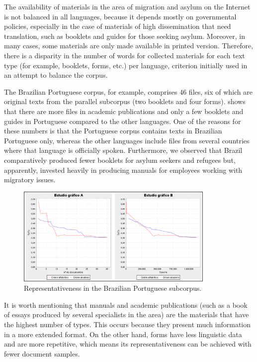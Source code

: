 \documentclass[english]{textolivre}
\begin{document}
The availability of materials in the area of migration and asylum on the Internet is not balanced in all languages, because it depends mostly on governmental policies, especially in the case of materials of high dissemination that need translation, such as booklets and guides for those seeking asylum. Moreover, in many cases, some materials are only made available in printed version. Therefore, there is a disparity in the number of words for collected materials for each text type (for example, booklets, forms, etc.) per language, criterion initially used in an attempt to balance the corpus.

The Brazilian Portuguese corpus, for example, comprises 46 files, six of which are original texts from the parallel subcorpus (two booklets and four forms).  shows that there are more files in academic publications and only a few booklets and guides in Portuguese compared to the other languages. One of the reasons for these numbers is that the Portuguese corpus contains texts in Brazilian Portuguese only, whereas the other languages include files from several countries where that language is officially spoken. Furthermore, we observed that Brazil comparatively produced fewer booklets for asylum seekers and refugees but, apparently, invested heavily in producing manuals for employees working with migratory issues.

\begin{figure}[htbp]
\centering
\includegraphics[width=0.85\textwidth]{Figura06.png}
\caption{Representativeness in the Brazilian Portuguese subcorpus.}
\label{Figura06}
\end{figure}

It is worth mentioning that manuals and academic publications (such as a book of essays produced by several specialists in the area) are the materials that have the highest number of types. This occurs because they present much information in a more extended format. On the other hand, forms have less linguistic data and are more repetitive, which means its representativeness can be achieved with fewer document samples.
\end{document}
